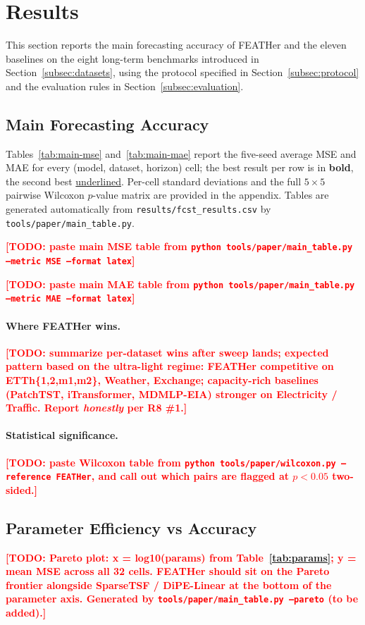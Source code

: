 \documentclass[journal]{IEEEtran}
\theoremstyle{remark}
\newcommand{\TODO}[1]{\textcolor{red}{\textbf{[TODO: #1]}}}
\begin{document}
\section{Results}
\label{sec:results}

This section reports the main forecasting accuracy of FEATHer and the
eleven baselines on the eight long-term benchmarks introduced in
Section~\ref{subsec:datasets}, using the protocol specified in
Section~\ref{subsec:protocol} and the evaluation rules in
Section~\ref{subsec:evaluation}.

\subsection{Main Forecasting Accuracy}
\label{subsec:results-main}
Tables~\ref{tab:main-mse} and~\ref{tab:main-mae} report the
five-seed average MSE and MAE for every (model, dataset, horizon)
cell; the best result per row is in \textbf{bold}, the second best
\underline{underlined}. Per-cell standard deviations and the full
$5\!\times\!5$ pairwise Wilcoxon $p$-value matrix are provided in
the appendix. Tables are generated automatically from
\texttt{results/fcst\_results.csv} by
\texttt{tools/paper/main\_table.py}.

\TODO{paste main MSE table from \texttt{python tools/paper/main\_table.py --metric MSE --format latex}}

\TODO{paste main MAE table from \texttt{python tools/paper/main\_table.py --metric MAE --format latex}}

\paragraph{Where FEATHer wins.}
\TODO{summarize per-dataset wins after sweep lands; expected pattern
based on the ultra-light regime: FEATHer competitive on
ETTh\{1,2,m1,m2\}, Weather, Exchange; capacity-rich baselines
(PatchTST, iTransformer, MDMLP-EIA) stronger on
Electricity / Traffic. Report \emph{honestly} per R8 \#1.}

\paragraph{Statistical significance.}
\TODO{paste Wilcoxon table from \texttt{python tools/paper/wilcoxon.py --reference FEATHer}, and call out which pairs are flagged at $p<0.05$ two-sided.}

\subsection{Parameter Efficiency vs Accuracy}
\label{subsec:results-pareto}
\TODO{Pareto plot: x = log10(params) from Table~\ref{tab:params};
y = mean MSE across all 32 cells. FEATHer should sit on the
Pareto frontier alongside SparseTSF / DiPE-Linear at the bottom
of the parameter axis. Generated by
\texttt{tools/paper/main\_table.py --pareto} (to be added).}
\end{document}

